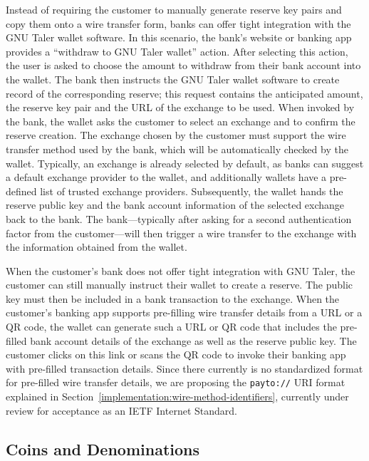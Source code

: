 Instead of requiring the customer to manually generate reserve key pairs and
copy them onto a wire transfer form, banks can offer tight integration with the
GNU Taler wallet software.  In this scenario, the bank's website or banking app
provides a ``withdraw to GNU Taler wallet'' action.  After selecting this
action, the user is asked to choose the amount to withdraw from their bank
account into the wallet.  The bank then instructs the GNU Taler wallet software
to create record of the corresponding reserve; this request contains the anticipated amount, the
reserve key pair and the URL of the exchange to be used.  When invoked by the
bank, the wallet asks the customer to select an exchange and to confirm the
reserve creation.  The exchange chosen by the customer must support the wire
transfer method used by the bank, which will be automatically checked by the
wallet.  Typically, an exchange is already selected by default, as banks can
suggest a default exchange provider to the wallet, and additionally wallets
have a pre-defined list of trusted exchange providers.  Subsequently, the wallet
hands the reserve public key and the bank account information of the selected
exchange back to the bank.  The bank---typically after asking for a second authentication
factor from the customer---will then trigger a wire transfer to the exchange with
the information obtained from the wallet.

When the customer's bank does not offer tight integration with GNU Taler, the
customer can still manually instruct their wallet to create a reserve.  The public
key must then be included in a bank transaction to the exchange.  When the
customer's banking app supports pre-filling wire transfer details from a URL or
a QR code, the wallet can generate such a URL or QR code that includes the
pre-filled bank account details of the exchange as well as the reserve public
key.  The customer clicks on this link or scans the QR code to invoke their
banking app with pre-filled transaction details.  Since there currently is no
standardized format for pre-filled wire transfer details, we are proposing the
\texttt{payto://} URI format explained in
Section~\ref{implementation:wire-method-identifiers}, currently under review
for acceptance as an IETF Internet Standard.



\subsection{Coins and Denominations}

